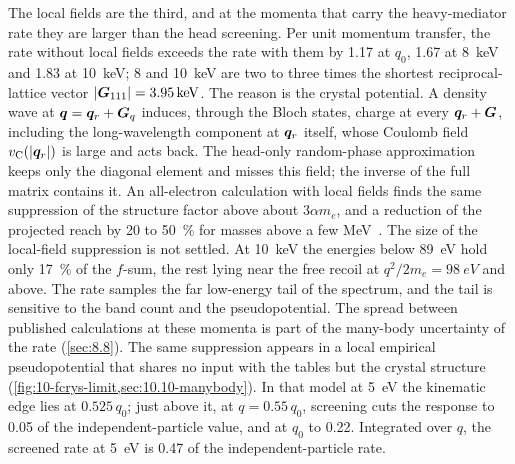 The local fields are the third, and at the momenta that carry the heavy-mediator rate they are larger than the head screening. Per unit momentum transfer, the rate without local fields exceeds the rate with them by 1.17 at $q_0$, 1.67 at \SI{8}{keV} and 1.83 at \SI{10}{keV}; 8 and \SI{10}{keV} are two to three times the shortest reciprocal-lattice vector $|\bm{G}_{111}| = \SI{3.95}{keV}$. The reason is the crystal potential. A density wave at $\bm{q} = \bm{q}_r + \bm{G}_q$ induces, through the Bloch states, charge at every $\bm{q}_r + \bm{G}$, including the long-wavelength component at $\bm{q}_r$ itself, whose Coulomb field $v_{\mathrm{C}}(|\bm{q}_r|)$ is large and acts back. The head-only random-phase approximation keeps only the diagonal element and misses this field; the inverse of the full matrix contains it. An all-electron calculation with local fields finds the same suppression of the structure factor above about $3\alpha m_e$, and a reduction of the projected reach by 20 to \SI{50}{\percent} for masses above a few MeV~\cite{dreyer2026all}. The size of the local-field suppression is not settled. At \SI{10}{keV} the energies below \SI{89}{eV} hold only \SI{17}{\percent} of the $f$-sum, the rest lying near the free recoil at $q^2/2m_e = \SI{98}{eV}$ and above. The rate samples the far low-energy tail of the spectrum, and the tail is sensitive to the band count and the pseudopotential. The spread between published calculations at these momenta is part of the many-body uncertainty of the rate (\cref{sec:8.8}). The same suppression appears in a local empirical pseudopotential that shares no input with the tables but the crystal structure (\cref{fig:10-fcrys-limit,sec:10.10-manybody}). In that model at \SI{5}{eV} the kinematic edge lies at $0.525\,q_0$; just above it, at $q = 0.55\,q_0$, screening cuts the response to 0.05 of the independent-particle value, and at $q_0$ to 0.22. Integrated over $q$, the screened rate at \SI{5}{eV} is 0.47 of the independent-particle rate.


